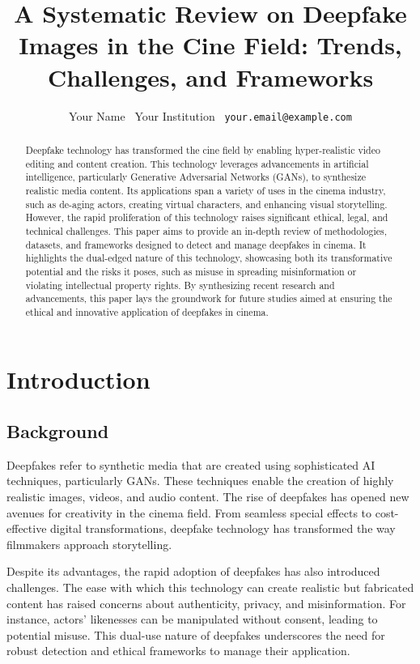 \documentclass[12pt]{article}
\title{A Systematic Review on Deepfake Images in the Cine Field: Trends, Challenges, and Frameworks}
\author{Your Name \ Your Institution \ \texttt{your.email@example.com}}
\date{}
\begin{document}
\maketitle

\begin{abstract}
Deepfake technology has transformed the cine field by enabling hyper-realistic video editing and content creation. This technology leverages advancements in artificial intelligence, particularly Generative Adversarial Networks (GANs), to synthesize realistic media content. Its applications span a variety of uses in the cinema industry, such as de-aging actors, creating virtual characters, and enhancing visual storytelling. However, the rapid proliferation of this technology raises significant ethical, legal, and technical challenges. This paper aims to provide an in-depth review of methodologies, datasets, and frameworks designed to detect and manage deepfakes in cinema. It highlights the dual-edged nature of this technology, showcasing both its transformative potential and the risks it poses, such as misuse in spreading misinformation or violating intellectual property rights. By synthesizing recent research and advancements, this paper lays the groundwork for future studies aimed at ensuring the ethical and innovative application of deepfakes in cinema.
\end{abstract}

\section{Introduction}
\subsection{Background}
Deepfakes refer to synthetic media that are created using sophisticated AI techniques, particularly GANs. These techniques enable the creation of highly realistic images, videos, and audio content. The rise of deepfakes has opened new avenues for creativity in the cinema field. From seamless special effects to cost-effective digital transformations, deepfake technology has transformed the way filmmakers approach storytelling. 

Despite its advantages, the rapid adoption of deepfakes has also introduced challenges. The ease with which this technology can create realistic but fabricated content has raised concerns about authenticity, privacy, and misinformation. For instance, actors’ likenesses can be manipulated without consent, leading to potential misuse. This dual-use nature of deepfakes underscores the need for robust detection and ethical frameworks to manage their application.
\end{document}
